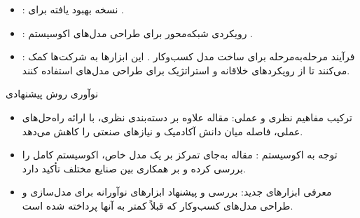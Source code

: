 \documentclass[10pt, twocolumn]{article}
\begin{document}
\begin{enumerate}
\begin{itemize}
\item {}:
نسخه بهبود یافته  برای .  

\item {}:
رویکردی شبکه‌محور برای طراحی مدل‌های اکوسیستم .  

\item {}: فرآیند مرحله‌به‌مرحله برای ساخت مدل کسب‌وکار .  
این ابزارها به شرکت‌ها کمک می‌کنند تا از رویکردهای خلاقانه و استراتژیک برای طراحی مدل‌های  استفاده کنند.  
\end{itemize}
\end{enumerate}
 نوآوری روش پیشنهادی  
\begin{itemize}
\item ترکیب مفاهیم نظری و عملی: مقاله علاوه بر دسته‌بندی نظری، با ارائه راه‌حل‌های عملی، فاصله میان دانش آکادمیک و نیازهای صنعتی را کاهش می‌دهد.  
\item توجه به اکوسیستم : مقاله به‌جای تمرکز بر یک مدل خاص، اکوسیستم کامل  را بررسی کرده و بر همکاری بین صنایع مختلف تأکید دارد.  
\item معرفی ابزارهای جدید: بررسی و پیشنهاد ابزارهای نوآورانه برای مدل‌سازی و طراحی مدل‌های کسب‌وکار  که قبلاً کمتر به آنها پرداخته شده است.  
\end{itemize}
\end{document}
